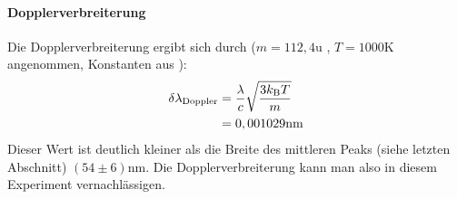 \paragraph{Dopplerverbreiterung}
Die Dopplerverbreiterung ergibt sich durch ($m = 112,4\si{\atomicmassunit}$ \cite{cd}, $ T = 1000\si{\kelvin}$ angenommen, Konstanten aus \cite{konst}):
\begin{align*}
\delta \lambda_\mathrm{Doppler} &= \frac{\lambda}{c}\sqrt{\frac{3k_\mathrm{B}T}{m}}\\
&= 0,001029 \si{\nano\meter}
\end{align*}
Dieser Wert ist deutlich kleiner als die Breite des mittleren Peaks (siehe letzten Abschnitt) $(54 \pm 6) \si{\nano\meter}$. Die Dopplerverbreiterung kann man also in diesem Experiment vernachlässigen.
